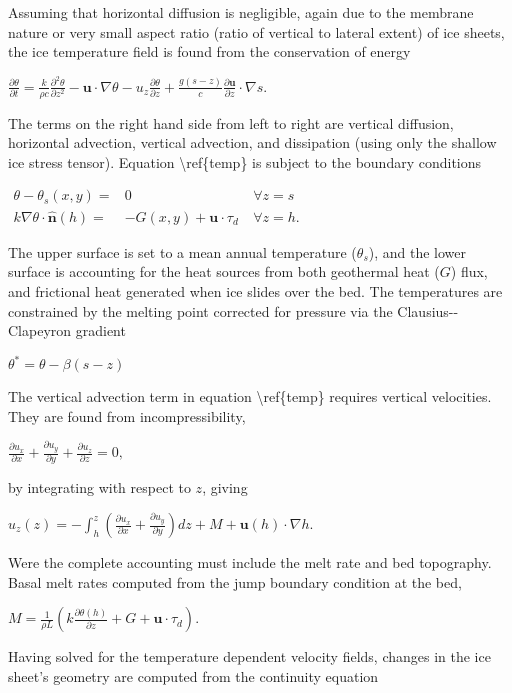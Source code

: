 Assuming that horizontal diffusion is negligible, again due to the
membrane nature or very small aspect ratio (ratio of vertical to lateral
extent) of ice sheets, the ice temperature field is found from the
conservation of energy

$ 
\frac{\partial \theta}{\partial t} = \frac{k}{\rho c}
\frac{\partial^2
\theta}{\partial z^2} -
\mathbf{u} \cdot \nabla \theta -
u_z \frac{\partial \theta}{\partial z} 
+ \frac{g(s-z)}{c}\frac{\partial \mathbf{u}}{\partial z} \cdot \nabla s.
$

The terms on the right hand side from left to right are vertical
diffusion, horizontal advection, vertical advection, and dissipation
(using only the shallow ice stress tensor). Equation
\textbackslash{}ref\{temp\} is subject to the boundary conditions

$\begin{matrix}
\theta - \theta_s(x,y) = & 0 &~\forall z=s \\
k \nabla \theta \cdot \mathbf{\hat n}(h) =& -G(x,y) + \mathbf{u} \cdot \tau_d
&~\forall z=h.
\end{matrix}$

The upper surface is set to a mean annual temperature ($\theta_s$), and
the lower surface is accounting for the heat sources from both
geothermal heat ($G$) flux, and frictional heat generated when ice
slides over the bed. The temperatures are constrained by the melting
point corrected for pressure via the Clausius-{}-Clapeyron gradient

$
\theta^* = \theta - \beta (s-z)
$

The vertical advection term in equation \textbackslash{}ref\{temp\}
requires vertical velocities. They are found from incompressibility,

$
\frac{\partial u_x}{\partial x} + 
\frac{\partial u_y}{\partial y} +
\frac{\partial u_z}{\partial z} = 0,
$

by integrating with respect to $z$, giving

$
u_z(z) = -\int_h^z \left( \frac{\partial u_x}{\partial x} + \frac{\partial
u_y}{\partial y}\right ) dz + M + \mathbf{u}(h) \cdot \nabla h.
$

Were the complete accounting must include the melt rate and bed
topography. Basal melt rates computed from the jump boundary condition
at the bed,

$
M = \frac{1}{\rho L} \left ( k \frac{\partial
\theta(h)}{\partial z} + G + \mathbf{u} \cdot \tau_d \right ).
$

Having solved for the temperature dependent velocity fields, changes in
the ice sheet's geometry are computed from the continuity equation

